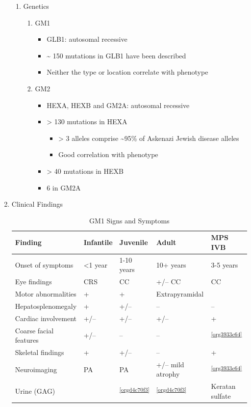 \documentclass{scrartcl}
\begin{document}
\begin{enumerate}
\begin{enumerate}
\item Genetics
\label{sec:org3083b08}
\begin{enumerate}
\item GM1
\label{sec:orged4e6b6}
\begin{itemize}
\item GLB1: autosomal recessive
\item \textasciitilde{} 150 mutations in GLB1 have been described
\item Neither the type or location correlate with phenotype
\end{itemize}

\item GM2
\label{sec:org513a9c5}
\begin{itemize}
\item HEXA, HEXB and GM2A: autosomal recessive
\item > 130 mutations in HEXA
\begin{itemize}
\item > 3 alleles comprise \textasciitilde{}95\% of Askenazi Jewish disease alleles
\item Good correlation with phenotype
\end{itemize}
\item > 40 mutations in HEXB
\item 6 in GM2A
\end{itemize}
\end{enumerate}
\end{enumerate}

\item Clinical Findings
\label{sec:org042b9fb}

\begin{table}[htbp]
\caption[ GM1 Signs and Symptoms]{\label{tab:org202febd}
GM1 Signs and Symptoms}
\centering
\begin{tabular}{lllll}
Finding & Infantile & Juvenile & Adult & MPS IVB\\
\hline
Onset of symptoms & <1 year & 1-10 years & 10+ years & 3-5 years\\
Eye findings & CRS & CC & +/– CC & CC\\
Motor abnormalities & + & + & Extrapyramidal & \footnotemark\\
Hepatosplenomegaly & + & +/– & – & –\\
Cardiac involvement & +/– & +/– & +/– & +\\
Coarse facial features & +/– & – & – & \textsuperscript{\ref{org3933c64}}\\
Skeletal findings & + & +/– & – & +\\
Neuroimaging & PA & PA & +/– mild atrophy & \textsuperscript{\ref{org3933c64}}\\
Urine (GAG) & \footnotemark & \textsuperscript{\ref{orgd4c70f3}} & \textsuperscript{\ref{orgd4c70f3}} & Keratan sulfate \footnotemark\\
\end{tabular}
\end{table}


\end{enumerate}
\end{document}
